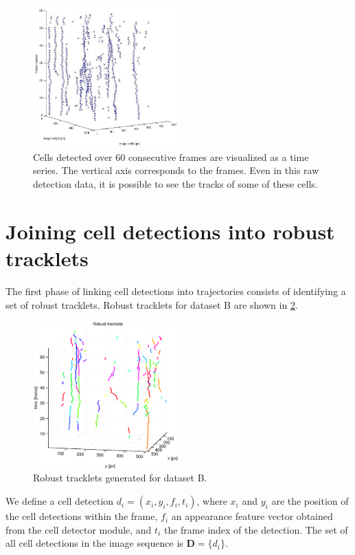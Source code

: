 		\begin{figure}[h]
			\centering
			\includegraphics[width=0.5\textwidth]{images/cell_tracks}
				\caption{Cells detected over 60 consecutive frames are visualized as a time series. The vertical axis corresponds to the frames. Even in this raw detection data, it is possible to see the tracks of some of these cells.}
			\label{fig:cell_tracks_detection}
		\end{figure}
	
	\section{Joining cell detections into robust tracklets}
		\label{sec:tracking_robusttracklets}
		The first phase of linking cell detections into trajectories consists of identifying a set of robust tracklets. Robust tracklets for dataset B are shown in \cref{fig:tracking_robust_2}.
		
		\begin{figure}[h]
			\centering
			\includegraphics[width=0.5\textwidth]{images/fig_tracking_robust_2}
			\caption{Robust tracklets generated for dataset B.}
			\label{fig:tracking_robust_2}
		\end{figure}
		
		We define a cell detection $ d_i = (x_i, y_i, f_i, t_i) $, where $x_i$ and $y_i$ are the position of the cell detections within the frame, $ f_i $ an appearance feature vector obtained from the cell detector module, and $t_i$ the frame index of the detection. The set of all cell detections in the image sequence is $\textbf{D} = \{d_i\}$. 
		
